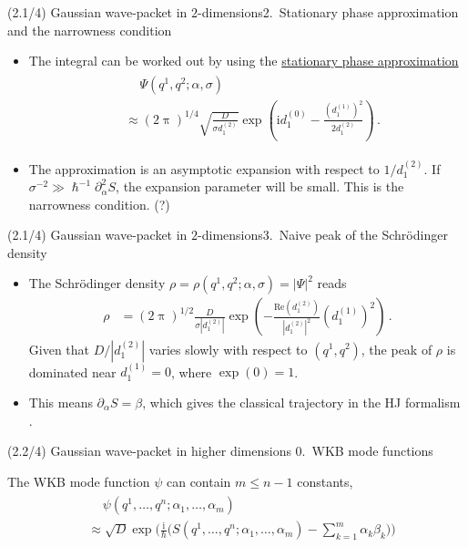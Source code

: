 \documentclass[mathserif]{beamer}
\newcommand{\rbr}[1]{{\left(#1\right)}}
\newcommand{\vbr}[1]{{\left|#1\right|}}
\newcommand{\rfun}[2]{#1\mathopen{}\left(#2\right)\mathclose{}}
\newcommand\mi{\mathrm{i}} %
\begin{document}
\begin{frame}{\boldmath (2.1/4) Gaussian wave-packet in $2$-dimensions}{2.\ Stationary phase approximation and the narrowness condition}
\begin{itemize}
    \item The integral can be worked out by using the \underline{stationary
    phase approximation}
    \begin{align}
    \begin{split}
    &\quad\,\rfun{\varPsi}{q^1, q^2; \alpha, \sigma}
    \\
    &\approx \rbr{2\uppi}^{1/4}\sqrt{\frac{D}{\sigma d^{(2)}_1}}
    \rfun{\exp}{\mi d^{(0)}_1 - \frac{\rbr{d^{(1)}_1}^{2}}{2d^{(2)}_1}}\,.
    \end{split}
\end{align}
\item
The approximation is an asymptotic expansion with respect to $1/d_1^{(2)}$. If $\sigma^{-2} \gg \hslash^{-1} \partial_\alpha^2 S$, the expansion parameter will be small. This is the \alert{narrowness condition}. (?)

\end{itemize}
\end{frame}

\begin{frame}{\boldmath (2.1/4) Gaussian wave-packet in $2$-dimensions}{3.\ Naive peak of the Schr\"odinger density}
\begin{itemize}
    \item The Schr\"odinger density $\rho = \rfun{\rho}{q^1, q^2; \alpha, \sigma} = \vbr{\varPsi}^2$ reads
        \begin{align}
    \rho &= 
    \rbr{2\uppi}^{1/2}\frac{D}{\sigma \vbr{d^{(2)}_1}}
    \rfun{\exp}{-\frac{\rfun{\mathrm{Re}}%
    { d^{(2)}_1}}{\vbr{d^{(2)}_1}^2}\rbr{d^{(1)}_1}^{2}}\,.
\end{align}
Given that $D/\vbr{d^{(2)}_1}$ varies slowly with respect to $\rbr{q^1, q^2}$,
the peak of $\rho$ is dominated near $d^{(1)}_1 = 0$, where 
$\rfun{\exp}{0} = 1$.
\item
This means \alert{$\partial_\alpha S = \beta$}, which gives the \alert{classical
trajectory} in the HJ formalism .
\end{itemize}

\end{frame}

\begin{frame}{(2.2/4) Gaussian wave-packet in higher dimensions}%
{0.\ WKB mode functions}

The WKB mode function $\psi$ can contain $m \le n-1$ constants, 
\begin{align}
    \begin{split}
        &\quad\,\rfun{\psi}{q^1, \ldots, q^n; \alpha_1, \ldots, \alpha_m} 
        \\
        &\approx \sqrt{D} \exp\!\Bigg(\frac{\mi}{\hslash}
        \Bigg(\rfun{S}{q^1,\ldots, q^n; \alpha_1,\ldots, \alpha_m} - \sum_{k=1}^{m}\alpha_k \beta_k\Bigg)\Bigg)
    \end{split}
\end{align}
\end{frame}
\end{document}
